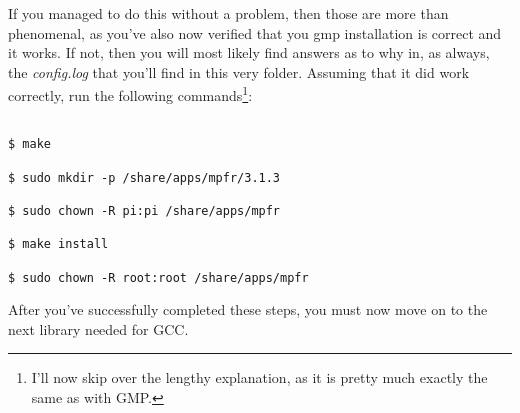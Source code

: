 \documentclass[]{article}
\begin{document}
                                                                                                                                                If you managed to do this without a problem, then those are more than phenomenal, as you've also now verified that you gmp installation 
                                                                                                                                                is correct and it works. If not, then you will most likely find answers as to why in, as always, the \textit{config.log} that you'll
                                                                                                                                                find in this very folder. Assuming that it did work correctly, run the following commands\footnote{I'll now skip over the lengthy 
                                                                                                                                                    explanation, as it is pretty much exactly the same as with GMP.}:
                                                                                                                                                    \begin{lstlisting}
                                                                                                                                                    $ make
                                                                                                                                                    $ sudo mkdir -p /share/apps/mpfr/3.1.3
                                                                                                                                                    $ sudo chown -R pi:pi /share/apps/mpfr
                                                                                                                                                    $ make install
                                                                                                                                                    $ sudo chown -R root:root /share/apps/mpfr
                                                                                                                                                    \end{lstlisting}
                                                                                                                                                    After you've successfully completed these steps, you must now move on to the next library needed for GCC.
\end{document}
